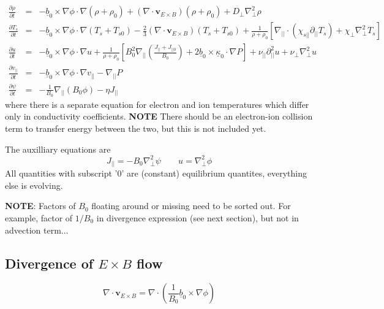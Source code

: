 \documentclass[12pt]{article}
\newcommand{\deriv}[2]{\ensuremath{\frac{\partial #1}{\partial #2}}}
\newcommand{\Vec}[1]{\ensuremath{\mathbf{#1}}}
\newcommand{\bvec}{\ensuremath{\underline{b}}}
\newcommand{\kvec}{\ensuremath{\underline{\kappa}}}
\begin{document}
\begin{eqnarray*}
  \deriv{\rho}{t} &=& -\bvec_0\times\nabla\phi\cdot\nabla\left(\rho + \rho_0\right) + \left(\nabla\cdot\Vec{v}_{E\times B}\right)\left(\rho + \rho_0\right) + D_\perp\nabla_\perp^2\rho \\
  \deriv{T_s}{t} &=& -\bvec_0\times\nabla\phi\cdot\nabla\left(T_s + T_{s0}\right) - \frac{2}{3}\left(\nabla\cdot\Vec{v}_{E\times B}\right)\left(T_s + T_{s0}\right) + \frac{1}{\rho + \rho_0}\left[ \nabla_{||}\cdot\left(\chi_{s||}\partial_{||}T_s\right) + \chi_\perp\nabla_\perp^2T_s\right] \\
  \deriv{u}{t} &=& -\bvec_0\times\nabla\phi\cdot\nabla u + \frac{1}{\rho+\rho_0}\left[ B_0^2\nabla_{||}\left(\frac{J_{||}+J_{||0}}{B_0}\right) + 2\bvec_0\times\kvec_0\cdot\nabla P\right] + \nu_{||}\partial_{||}^2u + \nu_\perp\nabla_\perp^2u \\
\deriv{v_{||}}{t} &=& -\bvec_0\times\nabla\phi\cdot\nabla v_{||} - \nabla_{||} P \\
\deriv{\psi}{t} &=& -\frac{1}{B_0}\nabla_{||}\left(B_0\phi\right) - \eta J_{||}
\end{eqnarray*}
where there is a separate equation for electron and ion temperatures which
differ only in conductivity coefficients. {\bf NOTE} There should be an
electron-ion collision term to transfer energy between the two, but this
is not included yet.

The auxilliary equations are
\[
J_{||} = -B_0\nabla_\perp^2\psi \qquad u = \nabla_\perp^2\phi
\]
All quantities with subscript '0' are (constant) equilibrium quantites, everything else is evolving.

{\bf NOTE}: Factors of $B_0$ floating around or missing need to be sorted out. For example, factor of $1/B_0$ in divergence expression (see next section), but not in advection term...
 
\subsection{Divergence of $E\times B$ flow}

\[
\nabla\cdot\Vec{v}_{E\times B} = \nabla\cdot\left(\frac{1}{B_0}\bvec_0\times\nabla\phi\right)
\]
\end{document}
